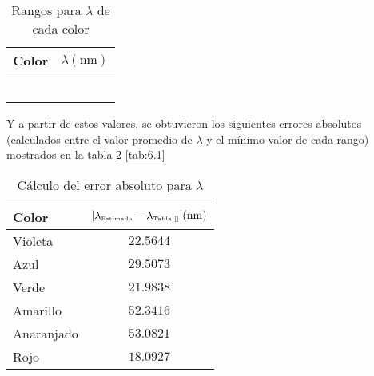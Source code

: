 \documentclass[12pt,a4paper]{article}
\begin{document}
	 \begin{table}[!htb]
	 	\centering
	 	\caption{Rangos para $ \lambda $ de cada color}
	 	\begin{tabular}{|l|c|}
	 		\hline
	 		Color & $ \lambda(\mbox{nm})$ \\
	 		\hline
	 		\cellcolor{violet!40     }{Violeta   } & \cellcolor{violet!25     }{$ 400 - 455 $}  \\ \hline
	 		\cellcolor{blue!40       }{Azul      } & \cellcolor{blue!25       }{$ 455 - 490 $}  \\ \hline
	 		\cellcolor{ForestGreen!40}{Verde     } & \cellcolor{ForestGreen!25}{$ 490 - 570 $}  \\ \hline
	 		\cellcolor{yellow!40     }{Amarillo  } & \cellcolor{yellow!25     }{$ 570 - 590 $}  \\ \hline
	 		\cellcolor{orange!40     }{Anaranjado} & \cellcolor{orange!25     }{$ 590 - 620 $}  \\ \hline
	 		\cellcolor{red!40        }{Rojo      } & \cellcolor{red!25        }{$ 620 - 780 $}  \\ \hline
	 	\end{tabular}
	 	\label{tab:5.1}
	 \end{table}
	 
	 Y a partir de estos valores, se obtuvieron los siguientes errores absolutos (calculados entre el valor promedio de $ \lambda $ y el mínimo valor de cada rango) mostrados en la tabla \ref{tab:6} \ref{tab:6.1}
	 
	 \begin{table}[!htb]
		 \centering
		 \caption{Cálculo del error absoluto para $ \lambda $}
		 \begin{tabular}{|l|c|}
		 	\hline
		 	Color & $ |\lambda_{\tiny\mbox{Estimado}}-\lambda_{\tiny\mbox{Tabla \ref{}}}| (\mbox{nm})$ \\
		 	\hline
		 	Violeta    & $ 22.5644 $  \\ \hline
		 	Azul       & $ 29.5073 $  \\ \hline
		 	Verde      & $ 21.9838 $  \\ \hline
		 	Amarillo   & $ 52.3416 $  \\ \hline
		 	Anaranjado & $ 53.0821 $  \\ \hline
		 	Rojo       & $ 18.0927 $  \\ \hline
		 \end{tabular}
		 \label{tab:6}
 	\end{table}
 
\end{document}
